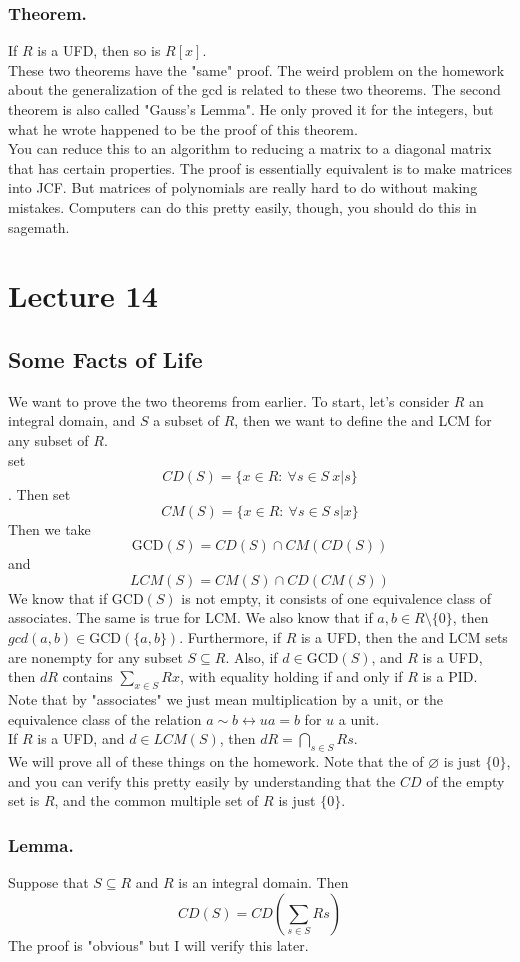 \documentclass{article}
\newcommand{\vs}{\bigskip\\\text{}}
\begin{document}
\subsubsection{Theorem.} If $R$ is a UFD, then so is $R[x]$. \vs
These two theorems have the "same" proof. The weird problem on the homework
about the generalization of the gcd is related to these two theorems. The second
theorem is also called "Gauss's Lemma". He only proved it for the integers, but
what he wrote happened to be the proof of this theorem.\vs
You can reduce this to an algorithm to reducing a matrix to a diagonal matrix
that has certain properties. The proof is essentially equivalent is to make
matrices into JCF. But matrices of polynomials are really hard to do without
making mistakes. Computers can do this pretty easily, though, you should do this
in sagemath.
\section{Lecture 14}
\subsection{Some Facts of Life}
We want to prove the two theorems from earlier. To start, let's consider $R$ an integral domain, and
$S$ a subset of $R$, then we want to define the  and LCM for any subset of
$R$. \vs
set \[CD(S) =\{ x \in R: \: \forall s\in S \: x | s\}\]. Then set 
\[
CM(S) =\{ x\in R: \: \forall s\in S \: s | x\}
\]
Then we take 
\[\text{GCD}(S) = CD(S) \cap CM(CD(S))\]
and \[ LCM(S) = CM(S) \cap CD(CM(S))\]
We know that if $\text{GCD}(S)$ is not empty, it consists of one equivalence class of
associates. The same is true for LCM. We also know that if $a,b \in R\setminus
\{ 0\}$, then  $gcd(a,b) \in \text{GCD}(\{a,b\} )$. Furthermore, if $R$ is a UFD, then
the  and LCM sets are nonempty for any subset $S \subseteq R$. Also, if $d
\in \text{GCD}(S)$, and $R$ is a UFD, then $dR$ contains $\sum_{x\in S}Rx$, with
equality holding if and only if $R$ is a PID.\vs
Note that by "associates" we just mean multiplication by a unit, or the
equivalence class of the relation $a \sim b \leftrightarrow ua = b$ for $u$ a
unit. \vs
If  $R$ is a UFD, and $d\in LCM(S)$, then $dR = \bigcap_{s\in S}Rs$.\vs
We will prove all of these things on the homework. Note that the  of
$\varnothing$ is just $\{0\}$, and you can verify this pretty easily by
understanding that the $CD $ of the empty set is $R$, and the common multiple
set of $R$ is just $\{0\}$. 
\subsubsection{Lemma.} Suppose that $S \subseteq R$ and $R$ is an integral
domain. Then 
\[
CD(S) = CD\left(\sum_{s\in S}Rs\right)
\]
The proof is "obvious" but I will verify this later.
\end{document}
